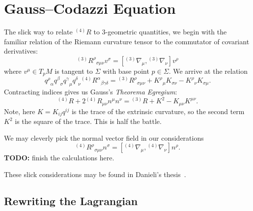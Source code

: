 \section{Gauss--Codazzi Equation}

The slick way to relate ${}^{(4)}R$ to 3-geometric quantities, we begin
with the familiar relation of the Riemann curvature tensor to the
commutator of covariant derivatives:
\begin{equation}
{}^{(3)}{R^{\rho}}_{\sigma\mu\nu}v^{\sigma}
  = [{}^{(3)}\nabla_{\mu}, {}^{(3)}\nabla_{\nu}]v^{\rho}
\end{equation}
where $v^{\mu}\in T_{p}M$ is tangent to $\Sigma$ with base point
$p\in\Sigma$.
We arrive at the relation
\begin{equation}
{q^{\rho}}_{\alpha}{q^{\beta}}_{\sigma}{q^{\gamma}}_{\mu}{q^{\delta}}_{\nu}
{{}^{(4)}\!}{R^{\alpha}}_{\beta\gamma\delta}
={{}^{(3)}\!}{R^{\rho}}_{\sigma\mu\nu} + {K^{\rho}}_{\mu}K_{\sigma\nu}-{K^{\rho}}_{\nu}K_{\sigma\mu}.
\end{equation}
Contracting indices gives us Gauss's \textit{Theorema Egregium}:
\begin{equation}
{{}^{(4)}\!}{R} + 2{{}^{(4)}\!}{R}_{\mu\nu}n^{\mu}n^{\nu}
={{}^{(3)}\!}{R} + K^{2} - K_{\mu\nu}K^{\mu\nu}.
\end{equation}
Note, here $K=K_{ij}q^{ij}$ is the trace of the extrinsic curvature, so
the second term $K^{2}$ is the square of the trace.
This is half the battle.

We may cleverly pick the normal vector field in our considerations
\begin{equation}
{}^{(4)}{R^{\rho}}_{\sigma\mu\nu}n^{\sigma}
  = [{}^{(4)}\nabla_{\mu}, {}^{(4)}\nabla_{\nu}]n^{\rho}.
\end{equation}
\textbf{TODO:} finish the calculations here.

These slick considerations may be found in Danieli's thesis~\cite[see \S2.3]{danieli}.

\subsection{Rewriting the Lagrangian}

